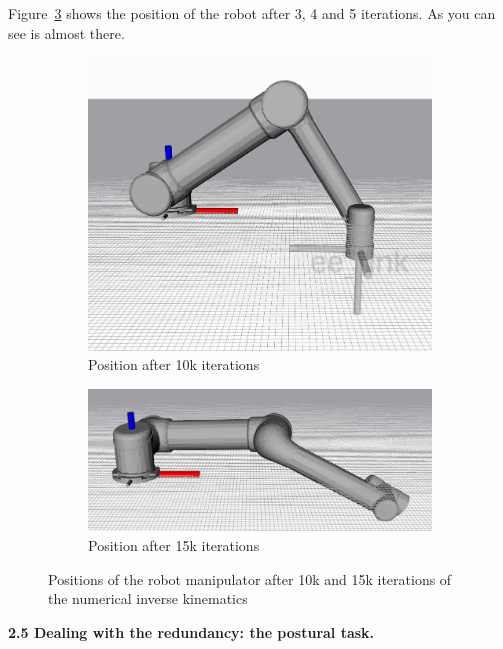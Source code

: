 \documentclass[11pt]{article}
\begin{document}
Figure~\ref{fig:ik} shows the position of the robot after 3, 4 and 5 iterations. As you can see is almost there. \\
\begin{figure}[H]
	\centering
	\begin{subfigure}[b]{0.4\textwidth}
		\centering
		\includegraphics[width=\textwidth]{10kit}
		\caption{Position after 10k iterations}
		\label{fig:10kit}
	\end{subfigure}
	\hfill
	\begin{subfigure}[b]{0.4\textwidth}
		\centering
		\includegraphics[width=\textwidth]{15kit}
		\caption{Position after 15k iterations}
		\label{fig:15kit}
	\end{subfigure}
	\caption{Positions of the robot manipulator after 10k and 15k iterations of the numerical inverse kinematics}
	\label{fig:ik}
\end{figure}


\textbf{2.5 Dealing with the redundancy: the postural task.} 
\end{document}
